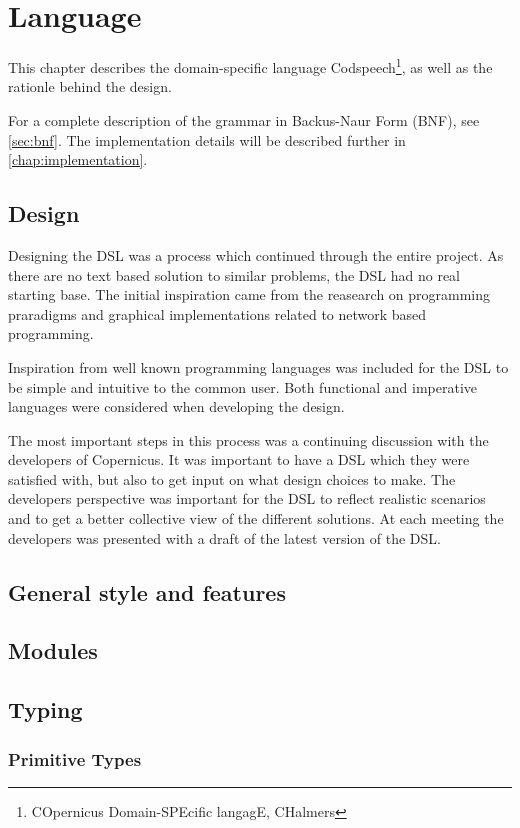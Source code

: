 \chapter{Language}\label{chap:language}
This chapter describes the domain-specific language
Codspeech\footnote{COpernicus Domain-SPEcific langagE, CHalmers}, as
well as the rationle behind the design.

For a complete description of the grammar in Backus-Naur Form (BNF),
see \autoref{sec:bnf}. The implementation details will be described
further in \autoref{chap:implementation}.


\section{Design}
Designing the DSL was a process which continued through the entire
project. As there are no text based solution to similar problems, the
DSL had no real starting base. The initial inspiration came from the
reasearch on programming praradigms and graphical implementations
related to network based programming.

Inspiration from well known programming languages was included for the
DSL to be simple and intuitive to the common user. Both functional and
imperative languages were considered when developing the design.

The most important steps in this process was a continuing discussion
with the developers of Copernicus. It was important to have a DSL
which they were satisfied with, but also to get input on what design
choices to make. The developers perspective was important for the DSL
to reflect realistic scenarios and to get a better collective view of
the different solutions. At each meeting the developers was presented
with a draft of the latest version of the DSL.


\section{General style and features}

\section{Modules}

\section{Typing}
\subsection{Primitive Types}

